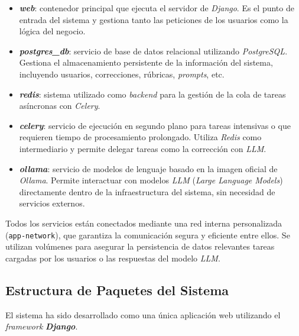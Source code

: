\begin{itemize}
  \item \textbf{\textit{web}}: contenedor principal que ejecuta el servidor de \textit{Django}. Es el punto de entrada del sistema y gestiona tanto las peticiones de los usuarios como la lógica del negocio.

  \item \textbf{\emph{postgres\_db}}: servicio de base de datos relacional utilizando \textit{PostgreSQL}. Gestiona el almacenamiento persistente de la información del sistema, incluyendo usuarios, correcciones, rúbricas, \textit{prompts}, etc.

  \item \textbf{\textit{redis}}: sistema utilizado como \textit{backend} para la gestión de la cola de tareas asíncronas con \textit{Celery}.

  \item \textbf{\textit{celery}}: servicio de ejecución en segundo plano para tareas intensivas o que requieren tiempo de procesamiento prolongado. Utiliza \textit{Redis} como intermediario y permite delegar tareas como la corrección con \textit{LLM}.

  \item \textbf{\textit{ollama}}: servicio de modelos de lenguaje basado en la imagen oficial de \textit{Ollama}. Permite interactuar con modelos \textit{LLM} (\textit{Large Language Models}) directamente dentro de la infraestructura del sistema, sin necesidad de servicios externos.

\end{itemize}

Todos los servicios están conectados mediante una red interna personalizada (\texttt{app-network}), que garantiza la comunicación segura y eficiente entre ellos. Se utilizan volúmenes para asegurar la persistencia de datos relevantes tareas cargadas por los usuarios o las respuestas del modelo \textit{LLM}.


\subsection{Estructura de Paquetes del Sistema}

El sistema ha sido desarrollado como una única aplicación web utilizando el \textit{framework} \textbf{\emph{Django}}.

